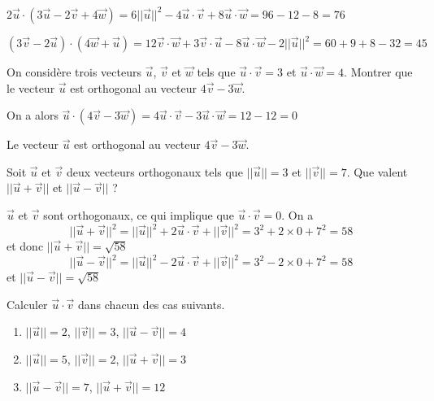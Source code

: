 \documentclass[11pt,fleqn, openany]{book} %
\begin{document}
\begin{solution} $ 2\vec u \cdot (3 \vec u - 2 \vec v + 4\vec w)=6\lvert \lvert \vec u\rvert \rvert ^2-4\vec u \cdot \vec v + 8 \vec u \cdot \vec w = 96-12-8=76$

$(3\vec v - 2 \vec u) \cdot (4\vec w + \vec u)=12\vec v \cdot \vec w + 3 \vec v \cdot \vec u -8 \vec u \cdot \vec w -2 \lvert \lvert \vec u\rvert \rvert^2=60+9+8-32=45$
\end{solution}




\begin{exercise}[topic=geom11]On considère trois vecteurs $\vec u$, $\vec v$ et $\vec w$ tels que $\vec u \cdot \vec v = 3$ et $\vec u \cdot \vec w=4$. Montrer que le vecteur $\vec u$ est orthogonal au vecteur $4\vec v - 3 \vec w$.\end{exercise}

\begin{solution}On a alors $\vec u \cdot (4\vec v - 3 \vec w)=4\vec u \cdot \vec v -3\vec u \cdot \vec w = 12-12=0$

Le vecteur $\vec u$ est orthogonal au vecteur $4\vec v - 3 \vec w$.\end{solution}




\begin{exercise}[topic=geom11]Soit $\vec u$ et $\vec v$ deux vecteurs orthogonaux tels que $\lvert\lvert\vec{u}\rvert\rvert=3$ et $\lvert\lvert\vec{v}\rvert\rvert=7$. Que valent $\lvert\lvert\vec u + \vec v\rvert\rvert$ et $\lvert\lvert\vec u -\vec v\rvert\rvert$ ?\end{exercise}

\begin{solution}$\vec u$ et $\vec v$ sont orthogonaux, ce qui implique que $\vec u \cdot \vec v = 0$. On a 
\[\lvert\lvert\vec u + \vec v\rvert\rvert^2 = \lvert\lvert\vec{u}\rvert\rvert^2 + 2 \vec u \cdot \vec v + \lvert\lvert\vec{v}\rvert\rvert^2 = 3^2+2\times 0 + 7^2 = 58\]
et donc $\lvert\lvert\vec u + \vec v\rvert\rvert=\sqrt{58}$
\[\lvert\lvert\vec u - \vec v\rvert\rvert^2 = \lvert\lvert\vec{u}\rvert\rvert^2 - 2 \vec u \cdot \vec v + \lvert\lvert\vec{v}\rvert\rvert^2 = 3^2-2\times 0 + 7^2 = 58\]
et $\lvert\lvert\vec u - \vec v\rvert\rvert=\sqrt{58}$\end{solution}




\begin{exercise}[topic=geom11]Calculer $\vec{u} \cdot \vec{v}$ dans chacun des cas suivants.
\begin{enumerate}
\item $\lvert\lvert\vec{u}\rvert\rvert=2$, $\lvert\lvert\vec{v}\rvert\rvert=3$, $\lvert\lvert\vec{u}-\vec{v}\rvert\rvert=4$
\item $\lvert\lvert\vec{u}\rvert\rvert=5$, $\lvert\lvert\vec{v}\rvert\rvert=2$, $\lvert\lvert\vec{u}+\vec{v}\rvert\rvert=3$
\item $\lvert\lvert\vec{u}-\vec{v}\rvert\rvert=7$, $\lvert\lvert\vec{u}+\vec{v}\rvert\rvert=12$
\end{enumerate}\end{exercise}
\end{document}
